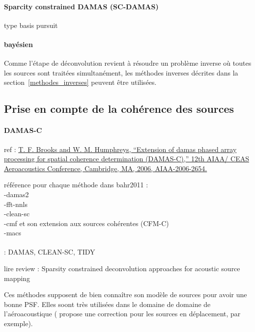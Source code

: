 \paragraph{Sparcity constrained DAMAS (SC-DAMAS)}
\cite{Yardibi2008}

type basis pursuit

\paragraph{bayésien}


Comme l'étape de déconvolution revient à résoudre un problème inverse où toutes les sources sont traitées simultanément, les méthodes inverses décrites dans la section~\ref{methodes_inverses} peuvent être utilisées.


\subsection{Prise en compte de la cohérence des sources}








\paragraph{DAMAS-C}
ref : \url{ T. F. Brooks and W. M. Humphreys, “Extension of damas phased array processing for spatial coherence determination (DAMAS-C),” 12th AIAA/ CEAS Aeroacoustics Conference, Cambridge, MA, 2006, AIAA-2006-2654.}



référence pour chaque méthode dans bahr2011 : \\
-damas2\\

-fft-nnls\\

-clean-sc\\

-cmf et son extension aux sources cohérentes (CFM-C) \cite{Yardibi2008} \\



-macs\\


~\\  : DAMAS, CLEAN-SC, TIDY

lire review : Sparsity constrained deconvolution approaches for acoustic
source mapping


Ces méthodes supposent de bien connaître son modèle de sources pour avoir une bonne PSF. Elles soont très utilisées dans le domaine de domaine de l'aéroacoustique (\cite{Fleury2012} propose une correction pour les sources en déplacement, par exemple).

